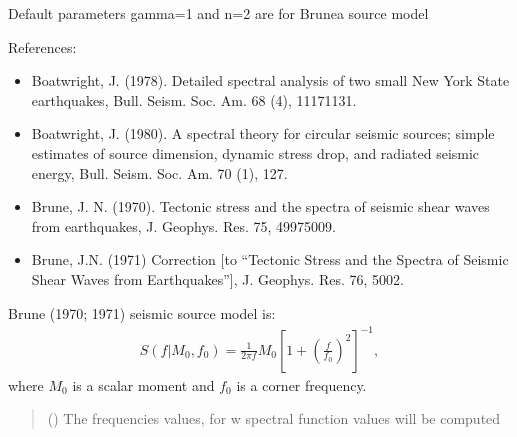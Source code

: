 \documentclass[letterpaper,10pt,english]{sphinxmanual}
\begin{document}
\begin{fulllineitems}
\sphinxAtStartPar
Default parameters gamma=1 and n=2 are for Brunea source model

\sphinxAtStartPar
References:
\begin{itemize}
\item {} 
\sphinxAtStartPar
Boatwright, J. (1978). Detailed spectral analysis of two small New York State earthquakes,
Bull. Seism. Soc. Am. 68 (4), 1117\textendash{}1131. 

\item {} 
\sphinxAtStartPar
Boatwright, J. (1980). A spectral theory for circular seismic sources; simple estimates of source dimension,
dynamic stress drop, and radiated seismic energy,
Bull. Seism. Soc. Am. 70 (1), 1\textendash{}27. 

\item {} 
\sphinxAtStartPar
Brune, J. N. (1970). Tectonic stress and the spectra of seismic shear waves from earthquakes,
J. Geophys. Res. 75, 4997\sphinxhyphen{}5009. 

\item {} 
\sphinxAtStartPar
Brune, J.N. (1971) Correction {[}to “Tectonic Stress and the Spectra of Seismic Shear Waves from Earthquakes”{]},
J. Geophys. Res. 76, 5002. 

\end{itemize}

\end{fulllineitems}


\begin{fulllineitems}
\label{\detokenize{api_support:amw.mw.source_models.BruneSourceModel}}
\pysigstartsignatures
{}
\pysigstopsignatures
\sphinxAtStartPar
Brune (1970; 1971) seismic source model is:
\begin{equation*}
\begin{split}S\left(f|M_0,f_0\right)={\frac{1}{2\pi f}M_0\left[{1+\left(\frac{f}{f_0}\right)}^2\right]}^{-1},\end{split}
\end{equation*}
\sphinxAtStartPar
where \(M_0\) is a scalar moment and \(f_0\) is a corner frequency.
\begin{quote}\begin{description}
\sphinxAtStartPar
{} () \textendash{} The frequencies values, for w spectral function values will be computed

\end{description}\end{quote}

\end{fulllineitems}
\end{document}
